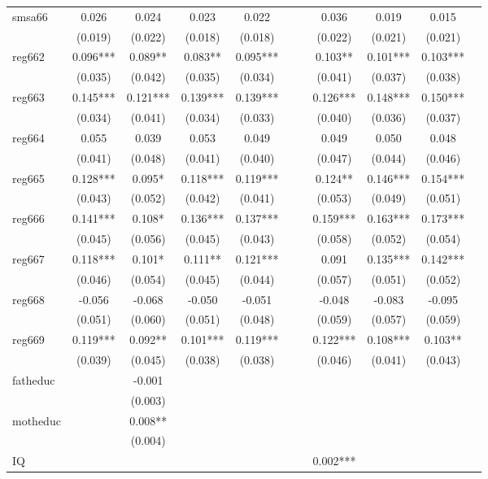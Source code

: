 \begin{table}[htbp]
\begin{tabular}{lcccccccccc}
smsa66 & 0.026 & 0.024 & 0.023 & 0.022 &  &  & 0.036 & 0.019 & 0.015 &  \\
 & (0.019) & (0.022) & (0.018) & (0.018) &  &  & (0.022) & (0.021) & (0.021) &  \\
reg662 & 0.096*** & 0.089** & 0.083** & 0.095*** &  &  & 0.103** & 0.101*** & 0.103*** &  \\
 & (0.035) & (0.042) & (0.035) & (0.034) &  &  & (0.041) & (0.037) & (0.038) &  \\
reg663 & 0.145*** & 0.121*** & 0.139*** & 0.139*** &  &  & 0.126*** & 0.148*** & 0.150*** &  \\
 & (0.034) & (0.041) & (0.034) & (0.033) &  &  & (0.040) & (0.036) & (0.037) &  \\
reg664 & 0.055 & 0.039 & 0.053 & 0.049 &  &  & 0.049 & 0.050 & 0.048 &  \\
 & (0.041) & (0.048) & (0.041) & (0.040) &  &  & (0.047) & (0.044) & (0.046) &  \\
reg665 & 0.128*** & 0.095* & 0.118*** & 0.119*** &  &  & 0.124** & 0.146*** & 0.154*** &  \\
 & (0.043) & (0.052) & (0.042) & (0.041) &  &  & (0.053) & (0.049) & (0.051) &  \\
reg666 & 0.141*** & 0.108* & 0.136*** & 0.137*** &  &  & 0.159*** & 0.163*** & 0.173*** &  \\
 & (0.045) & (0.056) & (0.045) & (0.043) &  &  & (0.058) & (0.052) & (0.054) &  \\
reg667 & 0.118*** & 0.101* & 0.111** & 0.121*** &  &  & 0.091 & 0.135*** & 0.142*** &  \\
 & (0.046) & (0.054) & (0.045) & (0.044) &  &  & (0.057) & (0.051) & (0.052) &  \\
reg668 & -0.056 & -0.068 & -0.050 & -0.051 &  &  & -0.048 & -0.083 & -0.095 &  \\
 & (0.051) & (0.060) & (0.051) & (0.048) &  &  & (0.059) & (0.057) & (0.059) &  \\
reg669 & 0.119*** & 0.092** & 0.101*** & 0.119*** &  &  & 0.122*** & 0.108*** & 0.103** &  \\
 & (0.039) & (0.045) & (0.038) & (0.038) &  &  & (0.046) & (0.041) & (0.043) &  \\
fatheduc &  & -0.001 &  &  &  &  &  &  &  &  \\
 &  & (0.003) &  &  &  &  &  &  &  &  \\
motheduc &  & 0.008** &  &  &  &  &  &  &  &  \\
 &  & (0.004) &  &  &  &  &  &  &  &  \\
IQ &  &  &  &  &  &  & 0.002*** &  &  &  \\

\end{tabular}
\end{table}
